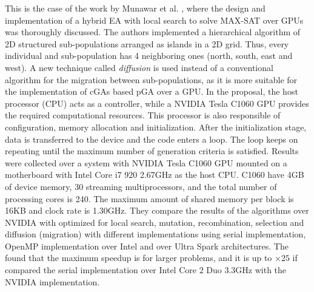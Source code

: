 \documentclass{article}
\begin{document}
This is the case of the work by Munawar et al. \cite{Munawar:2009:HGA:1666141_1666143}, where the design and implementation of a hybrid EA with local search to solve MAX-SAT over GPUs was thoroughly discussed. The authors implemented a hierarchical algorithm of 2D structured sub-populations arranged as islands in a 2D grid. Thus, every individual and sub-population has 4 neighboring ones (north, south, east and west). A new technique called {\em diffusion} is used instead of a conventional algorithm for the migration between sub-populations, as it is more suitable for the implementation of cGAs based pGA over a GPU. In the proposal, the host processor (CPU) acts as a controller, while a NVIDIA Tesla C1060 GPU provides the required computational resources. This processor is also responsible of configuration, memory allocation and initialization. After the initialization stage, data is transferred to the device and the code enters a loop. The loop keeps on repeating until the maximum number of generation criteria is satisfied. Results were collected over a system with NVIDIA Tesla C1060 GPU mounted on a motherboard with Intel Core i7 920 2.67GHz as the host CPU. C1060 have 4GB of device memory, 30 streaming multiprocessors, and the total number of processing cores is 240. The maximum amount of shared memory per block is 16KB and clock rate is 1.30GHz. They compare the results of the algorithms over NVIDIA with optimized for local search, mutation, recombination, selection and diffusion (migration) with different implementations using serial implementation, OpenMP implementation over Intel and over Ultra Spark architectures. The found that the maximum speedup is for larger problems, and it is up to $\times25$ if compared the serial implementation over Intel Core 2 Duo 3.3GHz with the NVIDIA implementation.

\end{document}
